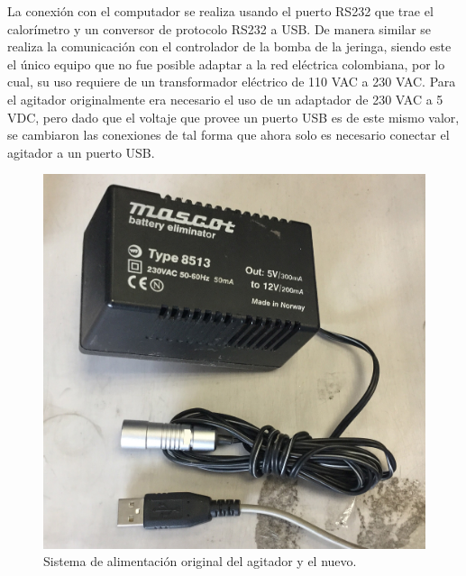 	La conexión con el computador se realiza usando el puerto RS232 que trae el calorímetro y un conversor de protocolo RS232 a USB. De manera similar se realiza la comunicación con el controlador de la bomba de la jeringa, siendo este el único equipo que no fue posible adaptar a la red eléctrica colombiana, por lo cual, su uso requiere de un transformador eléctrico de 110 VAC a 230 VAC. Para el agitador originalmente era necesario el uso de un adaptador de 230 VAC a 5 VDC, pero dado que el voltaje que provee un puerto USB es de este mismo valor, se cambiaron las conexiones de tal forma que ahora solo es necesario conectar el agitador a un puerto USB.
	\begin{figure}[h]
		\centering
		\includegraphics[width=0.5\linewidth]{Figures/motorCircuit}
		\caption{Sistema de alimentaci\'on original del agitador y el nuevo.}
	\end{figure}
	
